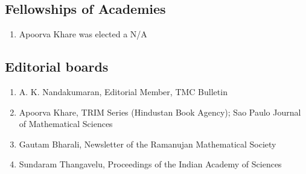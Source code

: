 \subsection{Fellowships of Academies}

\begin{enumerate}
\item Apoorva Khare was elected a N/A
\end{enumerate}

\subsection{Editorial boards}
\begin{enumerate}
\item A. K. Nandakumaran, Editorial Member, TMC Bulletin
\item Apoorva Khare, TRIM Series (Hindustan Book Agency); Sao Paulo Journal of Mathematical Sciences
\item Gautam Bharali, Newsletter of the Ramanujan Mathematical Society
\item Sundaram Thangavelu, Proceedings of the Indian Academy of Sciences
\end{enumerate}
